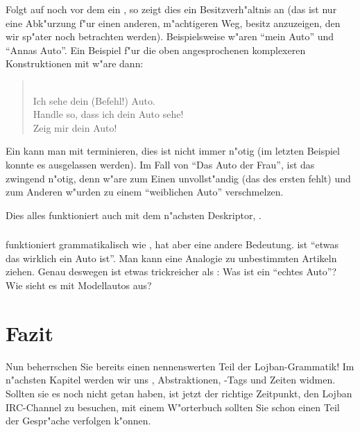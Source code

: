 Folgt auf  noch vor dem  ein , so zeigt dies ein Besitzverh"altnis an (das ist nur eine Abk"urzung f"ur einen
anderen, m"achtigeren Weg, besitz anzuzeigen, den wir sp"ater noch betrachten werden). Beispielsweise w"aren  ``mein Auto'' und
 ``Annas Auto''. 
Ein Beispiel f"ur die oben angesprochenen komplexeren Konstruktionen mit  w"are dann:
\begin{quote}
 \\
Ich sehe dein (Befehl!) Auto. \\
Handle so, dass ich dein Auto sehe! \\
Zeig mir dein Auto!
\end{quote}

Ein  kann man mit  terminieren, dies ist nicht immer n"otig (im letzten Beispiel konnte es ausgelassen werden).
Im Fall von ``Das Auto der Frau'',  ist das  zwingend n"otig, denn  w"are zum Einen
unvollst"andig (das  des ersten  fehlt) und zum Anderen w"urden  zu einem ``weiblichen Auto'' verschmelzen.

Dies alles funktioniert auch mit dem n"achsten Deskriptor, .

\subsubsection{}
 funktioniert grammatikalisch wie , hat aber eine andere Bedeutung.  ist ``etwas das wirklich ein Auto ist''. Man kann eine Analogie zu unbestimmten Artikeln ziehen.
Genau deswegen ist  etwas trickreicher als : Was ist ein ``echtes Auto''? Wie sieht es mit Modellautos aus?

\section{Fazit}
Nun beherrschen Sie bereits einen nennenswerten Teil der Lojban-Grammatik! Im n"achsten Kapitel werden wir uns , Abstraktionen,
-Tags und Zeiten widmen. Sollten sie es noch nicht getan haben, ist jetzt der richtige Zeitpunkt, den Lojban IRC-Channel zu besuchen, mit einem W"orterbuch sollten Sie schon einen Teil der Gespr"ache verfolgen k"onnen.
